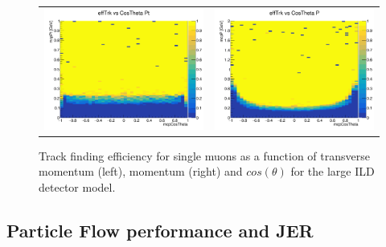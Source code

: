 %
% 
\begin{figure}[b!]
\begin{tabular}{cc}
\includegraphics[width=0.5\hsize]{Performance/fig/SingleMuon_EffTrk2DCosThetaPt.png} &
\includegraphics[width=0.5\hsize]{Performance/fig/SingleMuon_EffTrk2DCosThetaP.png}
\end{tabular}
\caption{\label{ild:fig:intro:tracking}Track finding efficiency for single muons as a function of transverse momentum (left),
  momentum (right) and $cos(\theta)$ for the large ILD detector model.  }
 \end{figure}


\subsection{Particle Flow performance and JER}


